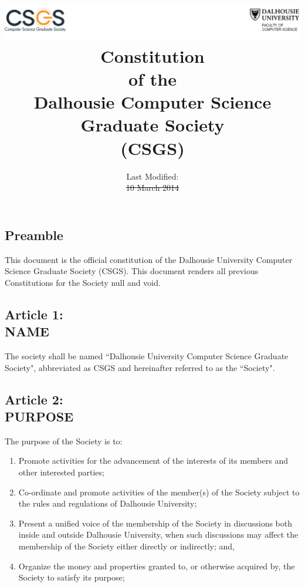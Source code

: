 \documentclass[]{report}
\title{
	\includegraphics[width=1.00\columnwidth]{header}\\
	\vspace{3.0 in}
	Constitution\\of the\\Dalhousie Computer Science Graduate Society\\(CSGS)
}
\author{ }
\date{Last Modified:\\\st{10 March 2014}\\\color{red}{10 March 2015}}
\begin{document}
\maketitle

\clearpage
\begin{center}
	\section*{Preamble}
	\vspace{12px}
\end{center}
\label{preamble}
	This document is the official constitution of the Dalhousie University Computer Science Graduate Society (CSGS). This document renders all previous Constitutions for the Society null and void.


\clearpage
\color{red}{
	\tableofcontents
}
\color{black}

\clearpage
\begin{center}
	\section*{Article 1:\\NAME}
	\vspace{12px}
\end{center}
\label{name}
	The society shall be named ``Dalhousie University Computer Science Graduate Society", abbreviated as CSGS and hereinafter referred to as the ``Society".


\clearpage
\begin{center}
	\section*{Article 2:\\PURPOSE}
	\vspace{12px}
\end{center}
\label{purpose}

	The purpose of the Society is to:\\
	
	\renewcommand{\theenumi}{\Alph{enumi}}
	\begin{enumerate}
	
		\item Promote activities for the advancement of the interests of its members and other interested parties;
		
		\item Co-ordinate and promote activities of the member(s) of the Society subject to the rules and regulations of Dalhousie University;
		
		\item Present a unified voice of the membership of the Society in discussions both inside and outside Dalhousie University, when such discussions may affect the membership of the Society either directly or indirectly; and,
		
		\item Organize the money and properties granted to, or otherwise acquired by, the Society to satisfy its purpose;

	\end{enumerate}
\end{document}
